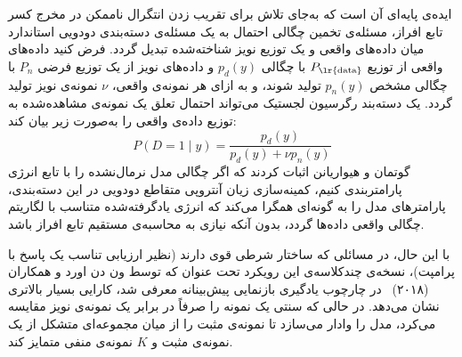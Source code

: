 ایده‌ی پایه‌ای  آن است که به‌جای تلاش برای تقریب زدن انتگرال ناممکن در مخرج کسر تابع افراز، مسئله‌ی تخمین چگالی احتمال به یک مسئله‌ی دسته‌بندی دودویی استاندارد میان داده‌های واقعی و یک توزیع نویز شناخته‌شده تبدیل گردد. فرض کنید داده‌های واقعی از توزیع $P_{\text{\lr{data}}}$ با چگالی $p_d(y)$ و داده‌های نویز از یک توزیع فرضی $P_n$ با چگالی مشخص $p_n(y)$ تولید شوند، و به ازای هر نمونه‌ی واقعی، $\nu$ نمونه‌ی نویز تولید گردد. یک دسته‌بند رگرسیون لجستیک می‌تواند احتمال تعلق یک نمونه‌ی مشاهده‌شده به توزیع داده‌ی واقعی را به‌صورت زیر بیان کند:
\begin{equation}\label{eq:chap2_nce_binary_prob}
    P(D=1 \mid y) = \frac{p_d(y)}{p_d(y) + \nu p_n(y)}
\end{equation}
گوتمان و هیواریانن اثبات کردند که اگر چگالی مدل نرمال‌نشده را با تابع انرژی پارامتربندی کنیم، کمینه‌سازی زیان آنتروپی متقاطع دودویی در این دسته‌بندی، پارامترهای مدل را به گونه‌ای همگرا می‌کند که انرژی یادگرفته‌شده متناسب با لگاریتم چگالی واقعی داده‌ها گردد، بدون آنکه نیازی به محاسبه‌ی مستقیم تابع افراز باشد.

با این حال، در مسائلی که ساختار شرطی قوی دارند (نظیر ارزیابی تناسب یک پاسخ با پرامپت)، نسخه‌ی چندکلاسه‌ی این رویکرد تحت عنوان  که توسط ون دن اورد و همکاران (۲۰۱۸)~\cite{oord2018representation} در چارچوب یادگیری بازنمایی پیش‌بینانه معرفی شد، کارایی بسیار بالاتری نشان می‌دهد. در حالی که  سنتی یک نمونه را صرفاً در برابر یک نمونه‌ی نویز مقایسه می‌کرد،  مدل را وادار می‌سازد تا نمونه‌ی مثبت را از میان مجموعه‌ای متشکل از یک نمونه‌ی مثبت و $K$ نمونه‌ی منفی متمایز کند.

